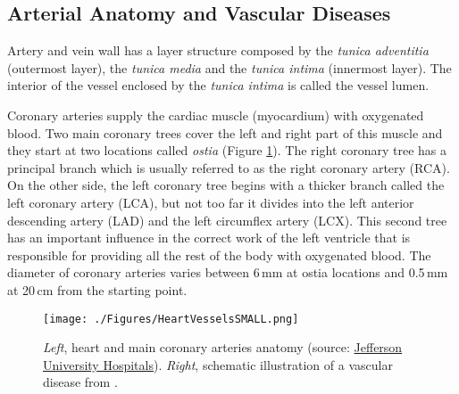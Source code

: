 \subsection{Arterial Anatomy and Vascular Diseases}
%

Artery and vein wall has a layer structure composed by the \textit{tunica adventitia} (outermost layer), the \textit{tunica media} and the \textit{tunica intima} (innermost layer). The interior of the vessel enclosed by the \textit{tunica intima} is called the vessel lumen.

Coronary arteries supply the cardiac muscle (myocardium) with oxygenated blood. Two main coronary trees cover the left and right part of this muscle and they start at two locations called \textit{ostia} (Figure \ref{fig:HeartVessels}). The right coronary tree has a principal branch which is usually referred to as the right coronary artery (RCA). On the other side, the left coronary tree begins with a thicker branch called the left coronary artery (LCA), but not too far it divides into the left anterior descending artery (LAD) and the left circumflex artery (LCX). This second tree has an important influence in the correct work of the left ventricle that is responsible for providing all the rest of the body with oxygenated blood. The diameter of coronary arteries varies between 6{\,}mm at ostia locations and 0.5{\,}mm at 20{\,}cm from the starting point.

\begin{figure}[ht]
	\centering
		\texttt{[image: ./Figures/HeartVesselsSMALL.png]}
	\caption[Coronary arteries anatomy and diseases]{\textit{Left}, heart and main coronary arteries anatomy (source: \href{http://www.jeffersonhospital.org/
Tests-and-Treatments/coronary-artery-bypass-grafting.aspx}{Jefferson University Hospitals}). \textit{Right}, schematic illustration of a vascular disease from \citep{Schaap2010Thesis}.}
	\label{fig:HeartVessels}
\end{figure}


